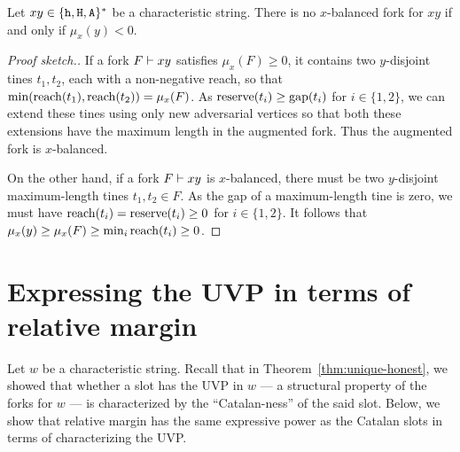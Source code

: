 \begin{fact}\label{fact:margin-balance}
  Let $xy \in \{\mathtt{h}, \mathtt{H}, \mathtt{A}\}^*$ be a characteristic string. 
  There is no 
  $x$-balanced fork for $xy$ 
  if and only if 
  $\mu_x(y) < 0$.
\end{fact}
\begin{proof}[Proof sketch.]  
  If a fork $F \vdash xy$ 
  satisfies $\mu_x(F) \geq 0$, 
  it contains two $y$-disjoint tines $t_1, t_2$, 
  each with a non-negative reach, 
  so that $\min(\operatorname{reach}(t_1), \operatorname{reach}(t_2)) = \mu_x(F)$. 
  As $\operatorname{reserve}(t_i) \geq \operatorname{gap}(t_i)$ for $i \in \{1,2\}$, 
  we can extend these tines using only new adversarial vertices 
  so that both these extensions 
  have the maximum length 
  in the augmented fork. 
  Thus the augmented fork is $x$-balanced.

  On the other hand, if a fork $F \vdash xy$ is $x$-balanced, 
  there must be two $y$-disjoint 
  maximum-length tines $t_1, t_2 \in F$. 
  As the gap of a maximum-length tine is zero, 
  we must have $\operatorname{reach}(t_i) = \operatorname{reserve}(t_i) \geq 0$ 
  for $i \in \{1, 2\}$. 
  It follows that $\mu_x(y) \geq \mu_x(F) \geq \min_i \operatorname{reach}(t_i) \geq 0$.
\end{proof}



\section[Expressing the UVP]{Expressing the UVP in terms of relative margin}\label{sec:uvp-through-margin}
Let $w$ be a characteristic string. 
Recall that in Theorem~\ref{thm:unique-honest}, 
we showed that whether a slot has the UVP in $w$ --- a 
structural property of the forks for $w$ --- is 
characterized by the ``Catalan-ness'' of the said slot. 
Below, we show that relative margin 
has the same expressive power 
as the Catalan slots 
in terms of characterizing the UVP. 


